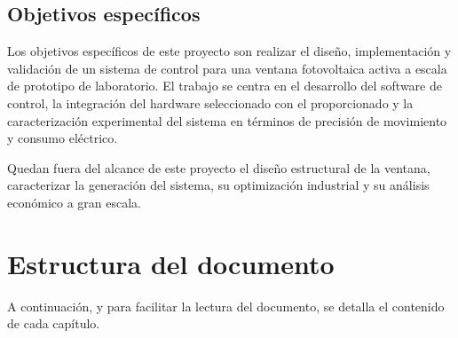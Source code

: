 \subsection{Objetivos específicos} \label{sec:obj_esp}

Los objetivos específicos de este proyecto son realizar el diseño, implementación y validación de un sistema de control para una ventana fotovoltaica activa a escala de prototipo de laboratorio. El trabajo se centra en el desarrollo del software de control, la integración  del hardware seleccionado con el proporcionado y la caracterización experimental del sistema en términos de precisión de movimiento y consumo eléctrico.

Quedan fuera del alcance de este proyecto el diseño estructural de la ventana, caracterizar la generación del sistema, su optimización industrial y su análisis económico a gran escala.


\section{Estructura del documento}

A continuación, y para facilitar la lectura del documento, se detalla el contenido de cada capítulo.

